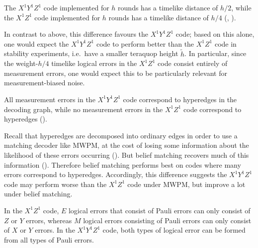 \begin{difference}\label{dif:XYZ_XZ_timelike_distance}
The $X^1 Y^1 Z^1$ code implemented for $h$ rounds has a timelike distance of $h/2$, while the $X^1 Z^1$ code implemented for $h$ rounds has a timelike distance of $h/4$ (, ).
\end{difference}

In contrast to  above, this difference favours the $X^1 Y^1 Z^1$ code;
based on this alone, one would expect the $X^1 Y^1 Z^1$ code to perform better than the $X^1 Z^1$ code in stability experiments,
i.e.\ have a smaller teraquop height $\tilde{h}$.
In particular, since the weight-$h/4$ timelike logical errors in the $X^1 Z^1$ code consist entirely of measurement errors,
one would expect this to be particularly relevant for measurement-biased noise.

\begin{difference}\label{dif:XYZ_XZ_hyperedges}
All measurement errors in the $X^1 Y^1 Z^1$ code correspond to hyperedges in the decoding graph, while no measurement errors in the $X^1 Z^1$ code correspond to hyperedges ().
\end{difference}

Recall that hyperedges are decomposed into ordinary edges in order to use a matching decoder like MWPM,
at the cost of losing some information about the likelihood of these errors occurring ().
But belief matching recovers much of this information ().
Therefore belief matching performs best on codes where many errors correspond to hyperedges.
Accordingly, this difference suggests the $X^1 Y^1 Z^1$ code may perform worse than the $X^1 Z^1$ code under MWPM,
but improve a lot under belief matching.

\begin{difference}\label{dif:XYZ_XZ_logicals_pauli_type}
In the $X^1 Z^1$ code, $E$ logical errors that consist of Pauli errors can only consist of $Z$ or $Y$ errors, whereas $M$ logical errors consisting of Pauli errors can only consist of $X$ or $Y$ errors.
In the $X^1 Y^1 Z^1$ code, both types of logical error can be formed from all types of Pauli errors.
\end{difference}

